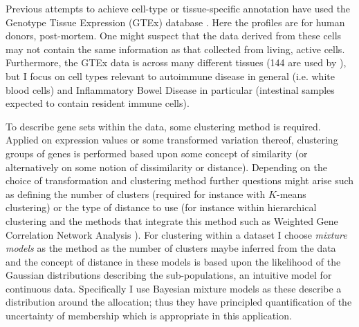 \documentclass[12pt]{article} %
\begin{document}
	
	Previous attempts to achieve cell-type or tissue-specific annotation have used the Genotype Tissue Expression (GTEx) \citep{GTExConsortiumGeneticeffectsgene2017} database \citep{LonsdaleGenotypeTissueExpressionGTEx2013}. Here the profiles are for human donors,
	post-mortem. One might suspect that the data derived from these cells may not contain the same information as that collected from living, active cells. Furthermore, the GTEx data is across many different tissues (144 are used by \citet{LonsdaleGenotypeTissueExpressionGTEx2013}), but I focus on cell types relevant to autoimmune disease in general (i.e. white blood cells) and Inflammatory Bowel Disease in particular (intestinal samples expected to contain resident immune cells).
	
	To describe gene sets within the data, some clustering method is required. Applied on expression values or some transformed variation thereof, clustering groups of genes is performed based upon some concept of similarity (or alternatively on some notion of dissimilarity or distance). Depending on the choice of transformation and clustering method further questions might arise such as defining the number of clusters (required for instance with $K$-means clustering) or the type of distance to use (for instance within hierarchical clustering and the methods that integrate this method such as Weighted Gene Correlation Network Analysis \citep{zhang2005general}). For clustering within a dataset I choose \emph{mixture models} as the method as the number of clusters maybe inferred from the data and the concept of distance in these models is based upon the likelihood of the Gaussian distributions describing the sub-populations, an intuitive model for continuous data. Specifically I use Bayesian mixture models as these describe a distribution around the allocation; thus they have principled quantification of the uncertainty of membership which is appropriate in this application. 
	
\end{document}
